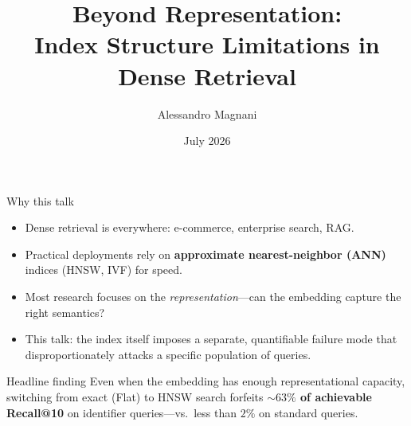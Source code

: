 \documentclass[10pt,aspectratio=169]{beamer}
\title{Beyond Representation:\\ Index Structure Limitations in Dense Retrieval}
\author{Alessandro Magnani}
\institute{AMLDS 2026 \;\textbar\; Osaka, Japan}
\date{July 2026}
\begin{document}
\begin{frame}[plain]
  \titlepage
\end{frame}

\begin{frame}{Why this talk}
  \begin{itemize}
    \item Dense retrieval is everywhere: e-commerce, enterprise search, RAG.
    \item Practical deployments rely on \textbf{approximate nearest-neighbor (ANN)} indices
          (HNSW, IVF) for speed.
    \item Most research focuses on the \emph{representation}---can the embedding
          capture the right semantics?
    \item This talk: \alert{the index itself imposes a separate, quantifiable failure mode}
          that disproportionately attacks a specific population of queries.
  \end{itemize}

  \vspace{0.5em}
  \begin{block}{Headline finding}
    Even when the embedding has enough representational capacity, switching from
    exact (Flat) to HNSW search forfeits \textbf{$\sim 63\%$ of achievable Recall@10}
    on identifier queries---vs.\ less than $2\%$ on standard queries.
  \end{block}
\end{frame}
\end{document}
